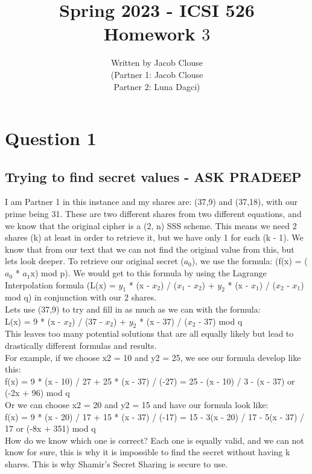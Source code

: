 \documentclass[10pt]{article}
\author{\vspace{0.2in}Written by Jacob Clouse\\  (Partner 1: Jacob Clouse\\ Partner 2: Luna Dagci)}
\title{Spring 2023 - ICSI 526\\Homework $3$}
\begin{document}
\maketitle
\tableofcontents
\vspace{0.2in}
\section{Question 1}
\subsection{Trying to find secret values - ASK PRADEEP}
\noindent I am Partner 1 in this instance and my shares are: (37,9) and  (37,18), with our prime being 31. These are \vspace{0.2in}two different shares from two different equations, and we know that the original cipher is a (2, n) SSS scheme. This means we need 2 shares (k) at least in order to retrieve it, but we have only 1 for each (k - 1). We know that from our text that we can not find the original value from this, but lets look deeper. To retrieve our original secret ($a_0$), we use the formula: (f(x) = ($a_0$ * $a_1$x) mod p). We would get to this formula by using the Lagrange Interpolation formula (L(x) = $y_1$ * (x - $x_2$) / ($x_1$ - $x_2$) + $y_2$ * (x - $x_1$) / ($x_2$ - $x_1$) mod q) in conjunction with our 2 shares.\\
\newline
Lets use (37,9) to try and fill in as much as we can with the formula:\\ L(x) = 9 * (x - $x_2$) / (37 - $x_2$) + $y_2$ * (x - 37) / ($x_2$ - 37) mod q\\
This leaves too many potential solutions that are all equally likely but lead to drastically different formulas and results. \\
\newline
For example, if we choose x2 = 10 and y2 = 25, we see our formula develop like this: \\
f(x) = 9 * (x - 10) / 27 + 25 * (x - 37) / (-27) = 25 - (x - 10) / 3 - (x - 37) or (-2x + 96) mod q\\
\newline
Or we can choose x2 = 20 and y2 = 15 and have our formula look like: \\
f(x) = 9 * (x - 20) / 17 + 15 * (x - 37) / (-17) = 15 - 3(x - 20) / 17 - 5(x - 37) / 17 or (-8x + 351) mod q\\
\newline
How do we know which one is correct? Each one is equally valid, and we can not know for sure, this is why it is impossible to find the secret without having k shares. This is why Shamir's Secret Sharing is secure to use. 
\end{document}
